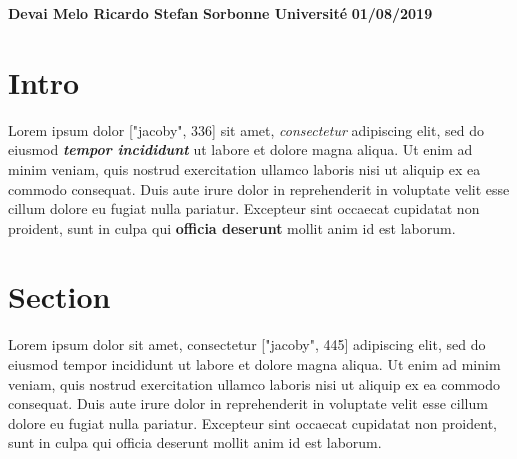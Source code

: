 \documentclass[12pt]{article}
\begin{document}
\begin{flushright}
\textbf{Devai Melo Ricardo Stefan}
\linebreak
\textbf{Sorbonne Université}
\linebreak
\textbf{01/08/2019}
\linebreak
\end{flushright}

\section*{Intro}
Lorem ipsum dolor ["jacoby", 336] sit amet, \emph{consectetur} adipiscing elit, sed do eiusmod \emph{\textbf{tempor incididunt}} ut labore et dolore magna aliqua. Ut enim ad minim veniam, quis nostrud exercitation ullamco laboris nisi ut aliquip ex ea commodo consequat. Duis aute irure dolor in reprehenderit in voluptate velit esse cillum dolore eu fugiat nulla pariatur. Excepteur sint occaecat cupidatat non proident, sunt in culpa qui \textbf{officia deserunt} mollit anim id est laborum.

\section*{Section}
Lorem ipsum dolor sit amet, consectetur ["jacoby", 445] adipiscing elit, sed do eiusmod tempor incididunt ut labore et dolore magna aliqua. Ut enim ad minim veniam, quis nostrud exercitation ullamco laboris nisi ut aliquip ex ea commodo consequat. Duis aute irure dolor in reprehenderit in voluptate velit esse cillum dolore eu fugiat nulla pariatur. Excepteur sint occaecat cupidatat non proident, sunt in culpa qui officia deserunt mollit anim id est laborum.
\end{document}
